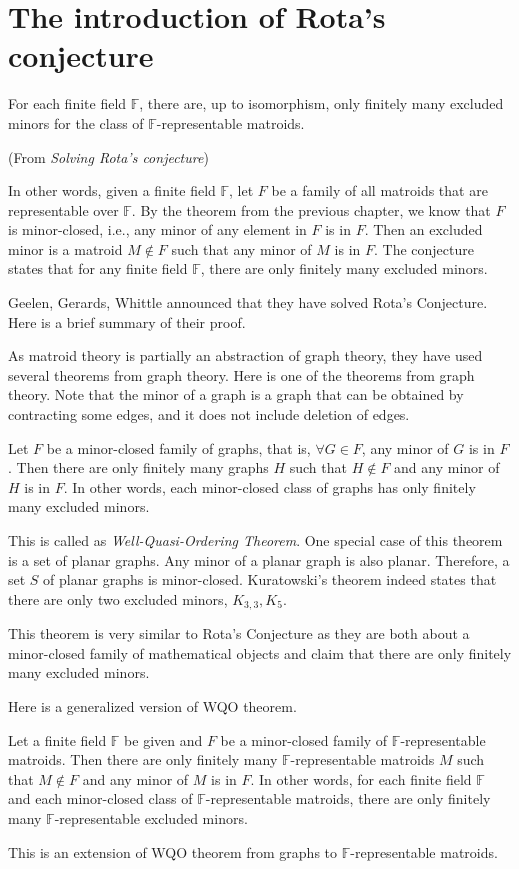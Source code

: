 \section{The introduction of Rota's conjecture}

\begin{conj}
For each finite field $\mathbb{F}$, there are, up to isomorphism, only finitely many excluded minors for the class of $\mathbb{F}$-representable matroids.
\end{conj}(From \textit{Solving Rota's conjecture})


In other words, given a finite field $\mathbb{F}$, let $F$ be a family of all matroids that are representable over $\mathbb{F}$.
By the theorem from the previous chapter, we know that $F$ is minor-closed, i.e., any minor of any element in $F$ is in $F$.
Then an excluded minor is a matroid $M \notin F$ such that any minor of $M$ is in $F$.
The conjecture states that for any finite field $\mathbb{F}$, there are only finitely many excluded minors.

Geelen, Gerards, Whittle announced that they have solved Rota's Conjecture.
Here is a brief summary of their proof.

As matroid theory is partially an abstraction of graph theory, they have used several theorems from graph theory.
Here is one of the theorems from graph theory.
Note that the minor of a graph is a graph that can be obtained by contracting some edges, and it does not include deletion of edges.

\begin{thm}
Let $F$ be a minor-closed family of graphs, that is, $\forall G \in F$, any minor of $G$ is in $F$.
Then there are only finitely many graphs $H$ such that $H \notin F$ and any minor of $H$ is in $F$.
In other words, each minor-closed class of graphs has only finitely many excluded minors.
\end{thm}

This is called as \textit{Well-Quasi-Ordering Theorem}.
One special case of this theorem is a set of planar graphs.
Any minor of a planar graph is also planar.
Therefore, a set $S$ of planar graphs is minor-closed.
Kuratowski's theorem indeed states that there are only two excluded minors, $K_{3, 3}, K_5$.

This theorem is very similar to Rota's Conjecture as they are both about a minor-closed family of mathematical objects and claim that there are only finitely many excluded minors.

Here is a generalized version of WQO theorem.

\begin{thm}
Let a finite field $\mathbb{F}$ be given and $F$ be a minor-closed family of $\mathbb{F}$-representable matroids.
Then there are only finitely many $\mathbb{F}$-representable matroids $M$ such that $M \notin F$ and any minor of $M$ is in $F$.
In other words, for each finite field $\mathbb{F}$ and each minor-closed class of $\mathbb{F}$-representable matroids, there are only finitely many $\mathbb{F}$-representable excluded minors.
\end{thm}

This is an extension of WQO theorem from graphs to $\mathbb{F}$-representable matroids.
